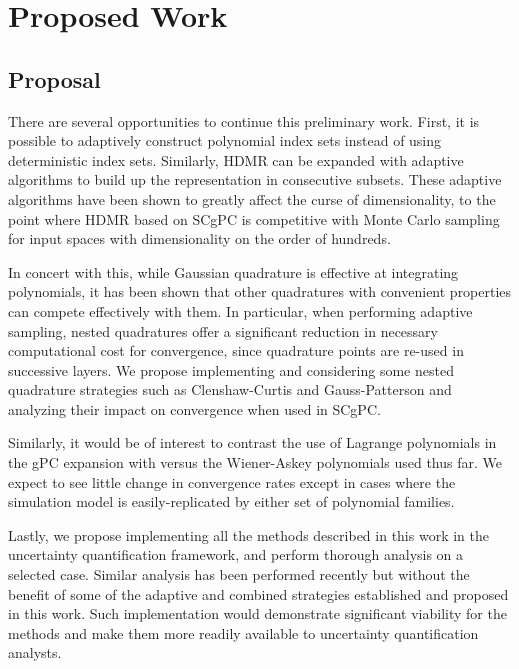 
\chapter{Proposed Work} %

\label{Chapter4} %



\section{Proposal}
There are several opportunities to continue this preliminary work.  First, it is possible \cite{Gerstner} to
adaptively construct polynomial index sets instead of using deterministic index sets.  Similarly, HDMR can be
expanded with adaptive algorithms to build up the representation in consecutive subsets\cite{Ayres}.  These adaptive
algorithms have been shown to greatly affect the curse of dimensionality, to the point where HDMR based on
SCgPC is competitive with Monte Carlo sampling for input spaces with dimensionality on the order of hundreds.

In concert with this, while Gaussian quadrature is effective at integrating polynomials, it has been shown
\cite{goodclenshaw} that other quadratures with convenient properties can compete effectively with them.  In
particular, when performing adaptive sampling, nested quadratures offer a significant reduction in necessary
computational cost for convergence, since quadrature points are re-used in successive layers.  We propose
implementing and considering some nested quadrature strategies such as Clenshaw-Curtis and Gauss-Patterson and
analyzing their impact on convergence when used in SCgPC.

Similarly, it would be of interest to contrast the use of Lagrange polynomials in the gPC expansion with
versus the Wiener-Askey polynomials used thus far.  We expect to see little change in convergence rates except
in cases where the simulation model is easily-replicated by either set of polynomial families.

Lastly, we propose implementing all the methods described in this work in the \raven{} uncertainty
quantification framework, and perform thorough analysis on a selected \bison{} case.  Similar analysis has
been performed recently \cite{bigbison} but without the benefit of some of the adaptive and combined
strategies established and proposed in this work.  Such implementation would demonstrate significant viability
for the methods and make them more readily available to uncertainty quantification analysts.
